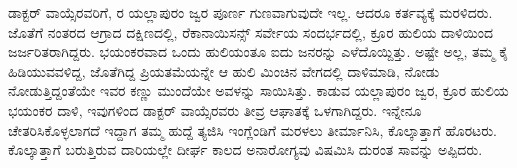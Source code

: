 ಡಾಕ್ಟರ್​ ವಾಯ್ಸೆರವರಿಗೆ, ರ ಯಲ್ಲಾಪುರಂ ಜ್ವರ ಪೂರ್ಣ ಗುಣವಾಗುವುದೇ ಇಲ್ಲ. ಆದರೂ ಕರ್ತವ್ಯಕ್ಕೆ ಮರಳಿದರು. ಜೊತೆಗೆ ನಂತರದ ಆಗ್ರಾದ ದಕ್ಷಿಣದಲ್ಲಿ, ರೆಕಾನಾಯಿಸನ್ಸ್​ ಸರ್ವೇಯ ಸಂದರ್ಭದಲ್ಲಿ, ಕ್ರೂರ ಹುಲಿಯ ದಾಳಿಯಿಂದ ಜರ್ಜರಿತರಾಗಿದ್ದರು. ಭಯಂಕರವಾದ ಒಂದು ಹುಲಿಯಂತೂ ಐದು ಜನರನ್ನು ಎಳೆದೊಯ್ದಿತ್ತು. ಅಷ್ಟೇ ಅಲ್ಲ, ತಮ್ಮ ಕೈ ಹಿಡಿಯುವವಳಿದ್ದ, ಜೊತೆಗಿದ್ದ ಪ್ರಿಯತಮೆಯನ್ನೇ ಆ ಹುಲಿ ಮಿಂಚಿನ ವೇಗದಲ್ಲಿ ದಾಳಿಮಾಡಿ, ನೋಡು ನೋಡುತ್ತಿದ್ದಂತೆಯೇ ಇವರ ಕಣ್ಣು ಮುಂದೆಯೇ ಅವಳನ್ನು ಸಾಯಿಸಿತ್ತು. ಕಾಡುವ ಯಲ್ಲಾಪುರಂ ಜ್ವರ, ಕ್ರೂರ ಹುಲಿಯ ಭಯಂಕರ ದಾಳಿ, ಇವುಗಳಿಂದ ಡಾಕ್ಟರ್​ ವಾಯ್ಸೆರವರು ತೀವ್ರ ಆಘಾತಕ್ಕೆ ಒಳಗಾಗಿದ್ದರು. ಇನ್ನೇನೂ ಚೇತರಿಸಿಕೊಳ್ಳಲಾಗದೆ ಇದ್ದಾಗ ತಮ್ಮ ಹುದ್ದೆ ತ್ಯಜಿಸಿ ಇಂಗ್ಲೆಂಡಿಗೆ ಮರಳಲು ತೀರ್ಮಾನಿಸಿ, ಕೊಲ್ಕಾತ್ತಾಗೆ ಹೊರಟರು. ಕೊಲ್ಕಾತ್ತಾಗೆ ಬರುತ್ತಿರುವ ದಾರಿಯಲ್ಲೇ ದೀರ್ಘ ಕಾಲದ ಅನಾರೋಗ್ಯವು ವಿಷಮಿಸಿ ದುರಂತ ಸಾವನ್ನು ಅಪ್ಪಿದರು.


